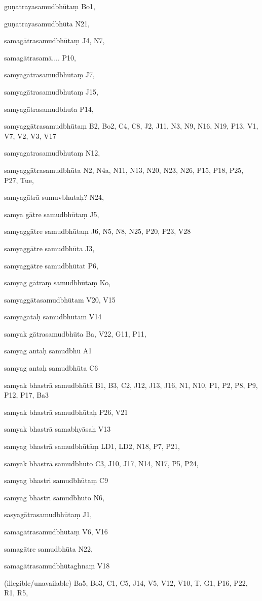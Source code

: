 \begin{ekdosis}
\begin{marma}[hp01_055]
\begin{marma}[hp02_009]
\begin{marma}[hp02_011]
\begin{marma}[hp02_67ab]
\begin{description}
    \end{description}
 \end{marma}

\begin{marma}[hp02_68a]
\item[guṇatrayasamudbhūtaṃ] Bo1,
\item[guṇatrayasamudbhūta] N21,
\item[samagātrasamudbhūtaṃ] J4, N7, 
\item[samagātrasamā....] P10, 
\item[samyagātrasamudbhūtaṃ] J7,
\item[samyagātrasamudbhutaṃ] J15,
\item[samyagātrasamudbhuta] P14,
\item[samyaggātrasamudbhūtaṃ] B2, Bo2, C4, C8, J2, J11, N3, N9, N16, N19, P13, V1, V7, V2, V3, V17
\item[samyagatrasamudbhutaṃ] N12,
\item[samyaggātrasamudbhūta] N2, N4a, N11, N13, N20, N23, N26, P15, P18, P25, P27, Tue, 
\item[samyagātrā sumuvbhutaḥ?] N24,
\item[samya gātre samudbhūtaṃ] J5,
\item[samyaggātre samudbhūtaṃ] J6, N5, N8, N25, P20, P23, V28
\item[samyaggātre samudbhūta] J3,
\item[samyaggātre samudbhūtat] P6, 
\item[samyag gātraṃ samudbhūtaṃ] Ko,
\item[samyaggātasamudbhūtam] V20, V15
\item[samyagataḥ samudbhūtam] V14
\item[samyak gātrasamudbhūta] Ba, V22, G11, P11, 
\item[samyag antaḥ samudbhū] A1
\item[samyag antaḥ samudbhūta] C6
\item[samyak bhastrā samudbhūtā] B1, B3, C2, J12, J13, J16, N1, N10, P1, P2, P8, P9, P12, P17, Ba3
\item[samyak bhastrā samudbhūtaḥ] P26, V21  
\item[samyak bhastrā samabhyāsaḥ] V13
\item[samyag bhastrā samudbhūtāṃ] LD1, LD2, N18, P7, P21, 
\item[samyak bhastrā samudbhūto] C3, J10, J17, N14, N17, P5, P24, 
\item[samyag bhastri samudbhūtaṃ] C9
\item[samyag bhastrī samudbhūto] N6, 
\item[sasyagātrasamudbhūtaṃ] J1,
\item[samagātrasamudbhūtaṃ] V6, V16
\item[samagātre samudbhūta] N22,
\item[samagātrasamudbhūtaghnaṃ] V18
\item[(illegible/unavailable)] Ba5, Bo3, C1, C5, J14, V5, V12, V10, T, G1, P16, P22, R1, R5,
  \begin{description}


\end{description}
\end{marma}
\end{marma}
\end{marma}
\end{marma}
\end{ekdosis}
